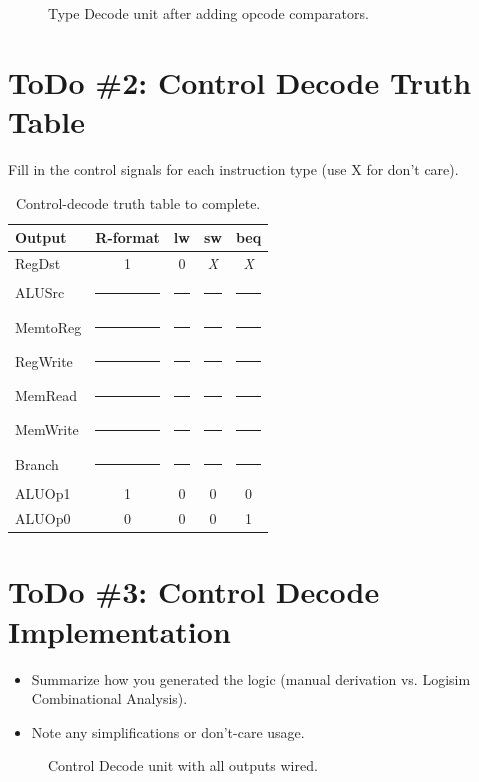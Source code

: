 \documentclass[11pt]{article}
\newcommand{\fillin}{\rule{2.5em}{0.4pt}}
\begin{document}
\begin{figure}[h]
  \centering
  \caption{Type Decode unit after adding opcode comparators.}
\end{figure}

\section{ToDo \#2: Control Decode Truth Table}
Fill in the control signals for each instruction type (use X for don't care).

\begin{table}[h]
  \centering
  \caption{Control-decode truth table to complete.}
  \begin{tabular}{lcccc}
    \toprule
    Output & R-format & lw & sw & beq \\
    \midrule
    RegDst   & 1     & 0     & \textit{X} & \textit{X} \\
    ALUSrc   & \fillin & \fillin & \fillin & \fillin \\
    MemtoReg & \fillin & \fillin & \fillin & \fillin \\
    RegWrite & \fillin & \fillin & \fillin & \fillin \\
    MemRead  & \fillin & \fillin & \fillin & \fillin \\
    MemWrite & \fillin & \fillin & \fillin & \fillin \\
    Branch   & \fillin & \fillin & \fillin & \fillin \\
    ALUOp1   & 1     & 0     & 0     & 0 \\
    ALUOp0   & 0     & 0     & 0     & 1 \\
    \bottomrule
  \end{tabular}
\end{table}

\section{ToDo \#3: Control Decode Implementation}
\begin{itemize}[leftmargin=*]
  \item Summarize how you generated the logic (manual derivation vs. Logisim Combinational Analysis).
  \item Note any simplifications or don't-care usage.
\end{itemize}

\begin{figure}[h]
  \centering
  \caption{Control Decode unit with all outputs wired.}
\end{figure}
\end{document}
